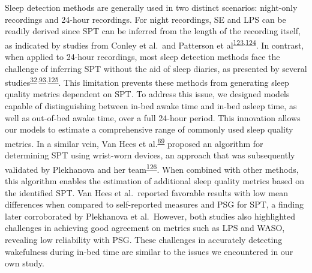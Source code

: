 \documentclass[
  9pt,
]{scrbook}
\begin{document}
Sleep detection methods are generally used in two distinct scenarios:
night-only recordings and 24-hour recordings. For night recordings, SE
and LPS can be readily derived since SPT can be inferred from the length
of the recording itself, as indicated by studies from Conley et al.~and
Patterson et
al\textsuperscript{\protect\hyperlink{ref-conley_agreement_2019}{123},\protect\hyperlink{ref-patterson_40_2023}{124}}.
In contrast, when applied to 24-hour recordings, most sleep detection
methods face the challenge of inferring SPT without the aid of sleep
diaries, as presented by several
studies\textsuperscript{\protect\hyperlink{ref-girschik_validation_2012}{32},\protect\hyperlink{ref-doherty_large_2017}{93},\protect\hyperlink{ref-anderson_assessment_2014}{125}}.
This limitation prevents these methods from generating sleep quality
metrics dependent on SPT. To address this issue, we designed models
capable of distinguishing between in-bed awake time and in-bed asleep
time, as well as out-of-bed awake time, over a full 24-hour period. This
innovation allows our models to estimate a comprehensive range of
commonly used sleep quality metrics. In a similar vein, Van Hees et
al.\textsuperscript{\protect\hyperlink{ref-van_hees_estimating_2018}{69}}
proposed an algorithm for determining SPT using wrist-worn devices, an
approach that was subsequently validated by Plekhanova and her
team\textsuperscript{\protect\hyperlink{ref-plekhanova_validation_2023}{126}}.
When combined with other methods, this algorithm enables the estimation
of additional sleep quality metrics based on the identified SPT. Van
Hees et al.~reported favorable results with low mean differences when
compared to self-reported measures and PSG for SPT, a finding later
corroborated by Plekhanova et al.~However, both studies also highlighted
challenges in achieving good agreement on metrics such as LPS and WASO,
revealing low reliability with PSG. These challenges in accurately
detecting wakefulness during in-bed time are similar to the issues we
encountered in our own study.
\end{document}
